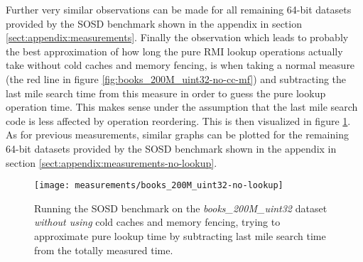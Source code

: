 Further very similar observations can be made for all remaining 64-bit datasets provided by the SOSD benchmark shown in the appendix in section \ref{sect:appendix:measurements}. Finally the observation which leads to probably the best approximation of how long the pure RMI lookup operations actually take without cold caches and memory fencing, is when taking a normal measure (the red line in figure \ref{fig:books_200M_uint32-no-cc-mf}) and subtracting the last mile search time from this measure in order to guess the pure lookup operation time. This makes sense under the assumption that the last mile search code is less affected by operation reordering. This is then visualized in figure \ref{fig:books_200M_uint32-no-lookup}. As for previous measurements, similar graphs can be plotted for the remaining 64-bit datasets provided by the SOSD benchmark shown in the appendix in section \ref{sect:appendix:measurements-no-lookup}.

\begin{figure}[ht]
  \centering
  \texttt{[image: measurements/books\_200M\_uint32-no-lookup]}
  \caption[Last mile search time measures and lookup time approximation \emph{without using} cold caches and memory fencing]{
    Running the SOSD benchmark on the \emph{books\_200M\_uint32} dataset \emph{without using} cold caches and memory fencing, trying to approximate pure lookup time by subtracting last mile search time from the totally measured time.
  }
  \label{fig:books_200M_uint32-no-lookup}
\end{figure}

